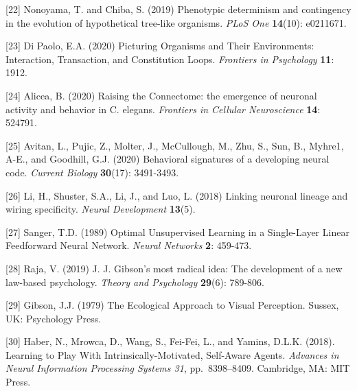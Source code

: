 \documentclass{article}
\begin{document}
[22] Nonoyama, T. and Chiba, S. (2019) Phenotypic determinism and contingency in the evolution of hypothetical tree-like organisms. {\it PLoS One} {\bf 14}(10): e0211671.

[23] Di Paolo, E.A. (2020) Picturing Organisms and Their Environments: Interaction, Transaction, and Constitution Loops. {\it Frontiers in Psychology} {\bf 11}: 1912.

[24] Alicea, B. (2020) Raising the Connectome: the emergence of neuronal activity and behavior in C. elegans. {\it Frontiers in Cellular Neuroscience} {\bf 14}: 524791. 

[25] Avitan, L., Pujic, Z., Molter, J., McCullough, M., Zhu, S., Sun, B., Myhre1, A-E., and Goodhill, G.J. (2020) Behavioral signatures of a developing neural code. {\it Current Biology} {\bf 30}(17): 3491-3493.

[26] Li, H., Shuster, S.A., Li, J., and Luo, L. (2018) Linking neuronal lineage and wiring specificity. {\it Neural Development} {\bf 13}(5).

[27] Sanger, T.D. (1989) Optimal Unsupervised Learning in a Single-Layer Linear Feedforward Neural Network. {\it Neural Networks} {\bf 2}: 459-473.

[28] Raja, V. (2019) J. J. Gibson’s most radical idea: The development of a new law-based psychology. {\it Theory and Psychology} {\bf 29}(6): 789-806.

[29] Gibson, J.J. (1979) The Ecological Approach to Visual Perception. Sussex, UK: Psychology Press.

[30] Haber, N., Mrowca, D., Wang, S., Fei-Fei, L., and Yamins, D.L.K. (2018). Learning to Play With Intrinsically-Motivated, Self-Aware Agents. {\it Advances in Neural Information Processing Systems 31}, pp.\ 8398–8409. Cambridge, MA: MIT Press.
\end{document}
